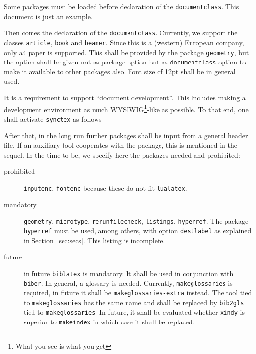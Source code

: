 \documentclass[a4paper,12pt]{article}
\begin{document}
Some packages must be loaded before declaration of the \texttt{documentclass}. 
This document is just an example. 


Then comes the declaration of the \texttt{documentclass}. 
Currently, we support the classes \texttt{article}, \texttt{book} and \texttt{beamer}. 
Since this is a (western) European company, only a4 paper is supported. 
This shall be provided by the package \texttt{geometry}, 
but the option shall be given not as package option but as \texttt{documentclass} option 
to make it available to other packages also. 
Font size of 12pt shall be in general used. 


It is a requirement to support ``document development''. 
This includes making a development environment as much 
WYSIWIG\footnote{What you see is what you get}-like as possible. 
To that end, one shall activate \texttt{synctex} as follows 



After that, in the long run further packages shall be input from a general header file. 
If an auxiliary tool cooperates with the package, 
this is mentioned in the sequel. 
In the time to be, we specify here the packages needed and prohibited: 
%
\begin{description}
  \item[prohibited] 
  \texttt{inputenc}, 
  \texttt{fontenc} because these do not fit \texttt{lualatex}. 
  \item[mandatory] 
  \texttt{geometry}, \texttt{microtype}, \texttt{rerunfilecheck}, 
  \texttt{listings}, \texttt{hyperref}. 
  The package \texttt{hyperref} must be used, among others, with option \texttt{destlabel} 
  as explained in Section~\ref{sec:secs}. 
  This listing is incomplete. 
  \item[future] in future \texttt{biblatex} is mandatory. 
  It shall be used in conjunction with \texttt{biber}. 
  In general, a glossary is needed. Currently, \texttt{makeglossaries} is required, 
  in future it shall be \texttt{makeglossaries-extra} instead. 
  The tool tied to \texttt{makeglossaries} has the same name 
  and shall be replaced by \texttt{bib2gls} tied to \texttt{makeglossaries}. 
  In future, it shall be evaluated whether \texttt{xindy} is superior to \texttt{makeindex} 
  in which case it shall be replaced. 
\end{description}
\end{document}
